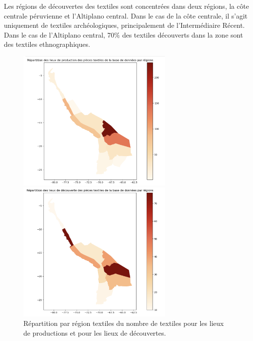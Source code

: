 Les régions de découvertes des textiles sont concentrées dans deux régions, la côte centrale péruvienne et l'Altiplano central. Dans le cas de la côte centrale, il s'agit uniquement de textiles archéologiques, principalement de l'Intermédiaire Récent. Dans le cas de l'Altiplano central, 70\% des textiles \og découverts \fg \:dans la zone sont des textiles ethnographiques.

\begin{figure}[!h]
    \begin{minipage}[c]{.5\linewidth}
            \begin{center}
                \includegraphics[height=7cm]{../images/geo_region_prod.png}
            \end{center}
    \end{minipage}
        \begin{minipage}[c]{.5\linewidth}
        \begin{center}
        		\includegraphics[height=7cm]{../images/geo_region_find.png}
	\end{center}
    \end{minipage}
    \caption{Répartition par région textiles du nombre de textiles pour les lieux de productions et pour les lieux de découvertes.}
    \label{fig:geo_count_region}   
\end{figure}

